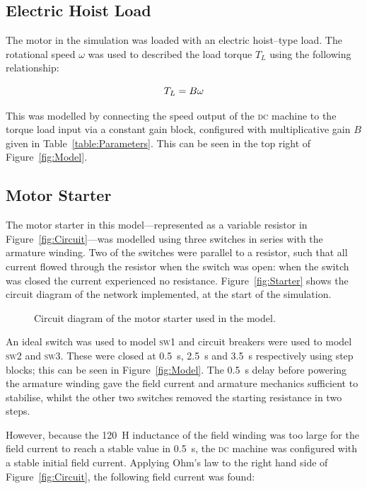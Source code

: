 \documentclass[a4paper,10pt]{article}
\newcommand{\s}{\si{\second}\xspace}
\renewcommand{\H}{\si{\henry}\xspace}
\newcommand{\DC}{\textsc{dc}\xspace}
\newcommand{\SW}[1]{\textsc{sw\footnotesize#1}\xspace}
\begin{document}
\subsection{Electric Hoist Load}

The motor in the simulation was loaded with an electric hoist--type load. The 
rotational speed $\omega$ was used to described the load torque $T_L$ 
using the following relationship:

\begin{equation} \label{eq:B}
    T_L = B\omega \\
\end{equation}

This was modelled by connecting the speed output of the \DC machine to the 
torque load input via a constant gain block, configured with multiplicative 
gain $B$ given in Table~\ref{table:Parameters}. This can be seen in the top 
right of Figure~\ref{fig:Model}.

\subsection{Motor Starter}

The motor starter in this model---represented as a variable resistor in 
Figure~\ref{fig:Circuit}---was modelled using three switches in series with the 
armature winding. Two of the switches were parallel to a resistor, such that 
all current flowed through the resistor when the switch was open: when the 
switch was closed the current experienced no resistance. 
Figure~\vref{fig:Starter} shows the circuit diagram of the network implemented, 
at the start of the simulation.

\begin{figure}[h]
    \centering
    \def\svgwidth{0.6\textwidth}
    
    \caption{Circuit diagram of the motor starter used in the model.}
    \label{fig:Starter}
\end{figure}

An ideal switch was used to model \SW{1} and circuit breakers were used to 
model \SW{2} and \SW{3}. These were closed at 0.5~\s, 2.5~\s and 3.5~\s 
respectively using step blocks; this can be seen in Figure~\vref{fig:Model}. 
The 0.5~\s delay before powering the armature winding gave the field current 
and armature mechanics sufficient to stabilise, whilst the other two switches 
removed the starting resistance in two steps.

However, because the 120~\H inductance of the field winding was too large for 
the field current to reach a stable value in 0.5~\s, the \DC machine was 
configured with a stable initial field current. Applying Ohm's law to the right 
hand side of Figure~\ref{fig:Circuit}, the following field current was found:
\end{document}
